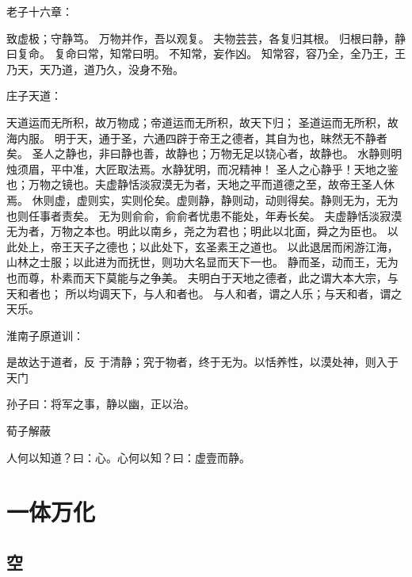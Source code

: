 老子十六章： 
\begin{shadequote}

致虚极；守静笃。
万物并作，吾以观复。
夫物芸芸，各复归其根。
归根曰静，静曰复命。
复命曰常，知常曰明。
不知常，妄作凶。
知常容，容乃全，全乃王，王乃天，天乃道，道乃久，没身不殆。

\end{shadequote}

庄子天道： 
\begin{shadequote}

    天道运而无所积，故万物成；帝道运而无所积，故天下归；
圣道运而无所积，故海内服。
明于天，通于圣，六通四辟于帝王之德者，其自为也，昧然无不静者矣。
圣人之静也，非曰静也善，故静也；万物无足以铙心者，故静也。
水静则明烛须眉，平中准，大匠取法焉。水静犹明，而况精神！
圣人之心静乎！天地之鉴也；万物之镜也。夫虚静恬淡寂漠无为者，天地之平而道德之至，故帝王圣人休焉。
休则虚，虚则实，实则伦矣。虚则静，静则动，动则得矣。静则无为，无为也则任事者责矣。
无为则俞俞，俞俞者忧患不能处，年寿长矣。
夫虚静恬淡寂漠无为者，万物之本也。明此以南乡，尧之为君也；明此以北面，舜之为臣也。
以此处上，帝王天子之德也；以此处下，玄圣素王之道也。
以此退居而闲游江海，山林之士服；以此进为而抚世，则功大名显而天下一也。
静而圣，动而王，无为也而尊，朴素而天下莫能与之争美。
夫明白于天地之德者，此之谓大本大宗，与天和者也；
所以均调天下，与人和者也。
与人和者，谓之人乐；与天和者，谓之天乐。

\end{shadequote}

淮南子原道训：
\begin{shadequote}

是故达于道者，反 于清静；究于物者，终于无为。以恬养性，以漠处神，则入于天门

\end{shadequote}

孙子曰：将军之事，静以幽，正以治。

荀子解蔽
\begin{shadequote}

人何以知道？曰：心。心何以知？曰：虚壹而静。

\end{shadequote}


\section{一体万化}

\subsection{空}

